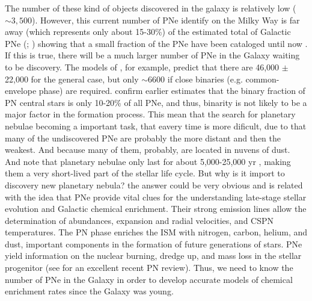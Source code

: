 \documentclass[fleqn,usenatbib]{mnras}
\begin{document}
The number of these kind of objects discovered in the galaxy is relatively low (\(\sim 3,500\)).
However, this current number of PNe identify on the Milky Way is far away (which represents
only about 15-30\%) of the estimated total of Galactic PNe (\citealp{Frew:2008}; \citealp{Jacoby:2010}) showing that a small fraction of the PNe have been cataloged until now \citep{Frew:2017}.
If this is true, there will be a much larger number of PNe in the Galaxy waiting to be discovery. The models of \citet{Moe:2006}, for example, predict that there are 46,000 $\pm$ 22,000
for the general case, but only $\sim$6600 \citep{Marco:2005} if close binaries
(e.g. common-envelope phase) are required. \citet{Miszalski:2009} confirm earlier estimates
that the binary fraction of PN central stars is only 10-20\% of all
PNe, and thus, binarity is not likely to be a major factor in
the formation process. This mean that the search for planetary nebulae
becoming a important task, that eavery time is more dificult, due to that many of
the undiscovered PNe are probably the more distant and then the weakest.
And because many of them, probably, are located in nuvens of dust.
And note that planetary nebulae only last for about 5,000-25,000 yr \citep{Badenes:2015},
making them a very short-lived part of the stellar life cycle.
But why is it import to discovery new planetary nebula? the answer could be very obvious and is
related with the idea that PNe provide vital clues for the understanding late-stage stellar
evolution and Galactic chemical enrichment. Their strong emission lines allow the determination
of abundances, expansion and radial velocities, and
CSPN temperatures. The PN phase enriches the ISM with nitrogen, carbon, helium,
and dust, important components in the formation of future
generations of stars. PNe yield information on the nuclear
burning, dredge up, and mass loss in the stellar progenitor
(see \citealp{Kwitter:2022} for an excellent recent PN
review). Thus, we need to know the number of PNe in
the Galaxy in order to develop accurate models of 
chemical enrichment rates since the Galaxy was young.
\end{document}
